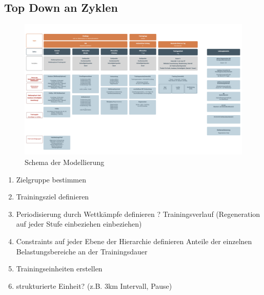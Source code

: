     \subsection{Top Down an Zyklen}
    \begin{figure}[htb]
    	\includegraphics[width=\textwidth]{gfx/modell.png}
    	\caption{Schema der Modellierung}
    	\label{fig:system:example1}
    \end{figure}
    \begin{enumerate}
        \item Zielgruppe bestimmen 
        \item Trainingsziel definieren
        \item Periodisierung durch Wettkämpfe definieren ? Trainingsverlauf (Regeneration auf jeder Stufe einbeziehen einbeziehen)
        \item Constraints auf jeder Ebene der Hierarchie definieren Anteile der einzelnen  Belastungsbereiche an der Trainingsdauer
        \item Trainingseinheiten erstellen
        \item strukturierte Einheit? (z.B. 3km Intervall, Pause)
    \end{enumerate}
    
    
    
